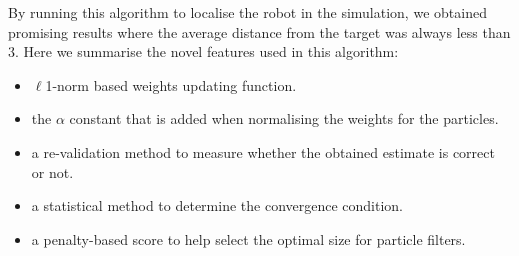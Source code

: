 \documentclass[12pt]{article}
\begin{document}
By running this algorithm to localise the robot in the simulation, we obtained promising results where the average distance from the target was always less than 3. Here we summarise the novel features used in this algorithm:

\begin{itemize}
  \item $\ell$1-norm based weights updating function.
  \item the $\alpha$ constant that is added when normalising the weights for the particles.
  \item a re-validation method to measure whether the obtained estimate is correct or not.
  \item a statistical method to determine the convergence condition.
  \item a penalty-based score to help select the optimal size for particle filters.
\end{itemize}
\end{document}
